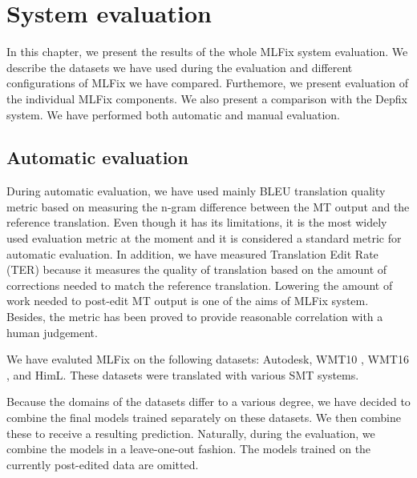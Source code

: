 \chapter{System evaluation}
\label{chap:eval}

In this chapter, we present the results of the whole MLFix system evaluation.
We describe the datasets we have used during the evaluation and different
configurations of MLFix we have compared. Furthemore, we present evaluation
of the individual MLFix components.
We also present a comparison with the Depfix
system. We have performed both automatic and manual evaluation.

\section{Automatic evaluation}

During automatic evaluation, we have used mainly BLEU \citep{papineni:2002} translation
quality metric based on measuring the n-gram difference between the MT output
and the reference translation.
Even though it has its limitations, it is the most widely used
evaluation metric at the moment and it is considered a standard metric for automatic evaluation.
In addition, we have 
measured Translation Edit Rate (TER) \citep{Snover06astudy} because it measures
the quality of translation based on the amount of corrections needed to match
the reference translation. Lowering the amount of work needed to post-edit MT output
is one of the aims of MLFix system. Besides, the metric has been proved to provide
reasonable correlation with a human judgement.

We have evaluted MLFix on the following datasets: Autodesk, WMT10\linebreak
\citep{callisonburch-EtAl:2010:WMT}, WMT16 \citep{bojar-EtAl:2016:WMT1}, and HimL.
These datasets
were translated with various SMT systems.

Because the domains of the datasets differ to a various degree,
we have decided to combine the final models trained separately
on these datasets. We then combine these to receive a resulting prediction.
Naturally, during the evaluation, we combine the models in a leave-one-out
fashion. The models trained on the currently post-edited data are omitted.



